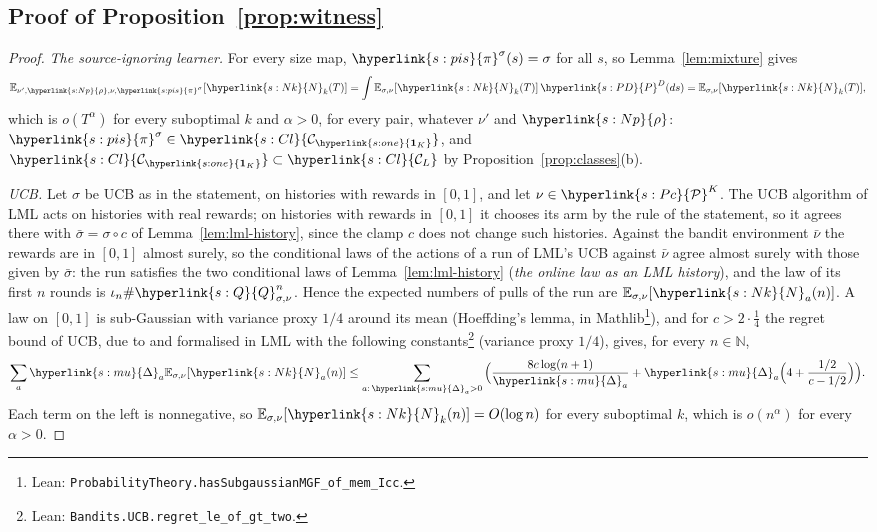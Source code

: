 \documentclass[11pt]{article}
\makeatletter
\newcommand{\sy}[2]{\hyperlink{#1}{#2}}
\newcommand{\E}{\mathbb{E}}
\newcommand{\N}{\mathbb{N}}
\newcommand{\Pc}{\sy{s:Pc}{\mathcal{P}}}
\newcommand{\ClL}[1][L]{\sy{s:Cl}{\mathcal{C}_{#1}}}
\newcommand{\one}{\sy{s:one}{\mathbf{1}_{K}}}
\newcommand{\rhos}{\sy{s:Np}{\rho}}
\newcommand{\PD}{\sy{s:PD}{P}^{D}}
\newcommand{\Q}{\sy{s:Q}{Q}}
\newcommand{\Nc}{\sy{s:Nk}{N}}
\newcommand{\gap}{\sy{s:mu}{\Delta}}
\newcommand{\pis}{\sy{s:pis}{\pi}^{\sigma}}
\newcommand{\leanfn}[1]{\ifincognita@blueprint\footnote{Lean: \nolinkurl{#1}.}\fi}
\makeatother
\begin{document}
\subsection{Proof of Proposition~\ref{prop:witness}}

\begin{proof}
\emph{The source-ignoring learner.} For every size map, $\pis(s)=\sigma$ for all $s$, so
Lemma~\ref{lem:mixture} gives
\begin{equation*}
\E_{\nu',\rhos,\nu,\pis}[\Nc_k(T)]=\int\E_{\sigma,\nu}[\Nc_k(T)]\,\PD(ds)=\E_{\sigma,\nu}[\Nc_k(T)],
\end{equation*}
which is $o(T^\alpha)$ for every suboptimal $k$ and $\alpha>0$, for every pair, whatever $\nu'$ and
$\rhos$: $\pis\in\ClL[\one]$, and $\ClL[\one]\subset\ClL$ by Proposition~\ref{prop:classes}(b).

\emph{UCB.} Let $\sigma$ be UCB as in the statement, on histories with rewards in $[0,1]$, and let
$\nu\in\Pc^K$. The UCB algorithm of LML acts on histories with real rewards; on histories with
rewards in $[0,1]$ it chooses its arm by the rule of the statement, so it agrees there with
$\bar\sigma=\sigma\circ c$ of Lemma~\ref{lem:lml-history}, since the clamp $c$ does not change such
histories. Against the bandit environment $\bar\nu$ the rewards are in $[0,1]$ almost surely, so
the conditional laws of the actions of a run of LML's UCB against $\bar\nu$ agree almost surely with
those given by $\bar\sigma$: the run satisfies the two conditional laws of
Lemma~\ref{lem:lml-history} (\emph{the online law as an LML history}), and the law of its first $n$
rounds is $\iota_n\#\Q^n_{\sigma,\nu}$. Hence the expected numbers of pulls of the run are
$\E_{\sigma,\nu}[\Nc_a(n)]$. A law on $[0,1]$ is sub-Gaussian with variance proxy $1/4$ around its
mean (Hoeffding's lemma, in Mathlib\leanfn{ProbabilityTheory.hasSubgaussianMGF_of_mem_Icc}), and
for $c>2\cdot\frac14$ the regret bound of UCB, due to \citet{ACF02} and formalised in LML with the
following constants\leanfn{Bandits.UCB.regret_le_of_gt_two} (variance proxy $1/4$), gives, for
every $n\in\N$,
\begin{equation*}
\sum_a\gap_a\E_{\sigma,\nu}[\Nc_a(n)]\le\sum_{a:\,\gap_a>0}\Big(\frac{8c\log(n+1)}{\gap_a}
+\gap_a\Big(4+\frac{1/2}{c-1/2}\Big)\Big).
\end{equation*}
Each term on the left is nonnegative, so $\E_{\sigma,\nu}[\Nc_k(n)]=O(\log n)$ for every suboptimal
$k$, which is $o(n^\alpha)$ for every $\alpha>0$.
\end{proof}
\end{document}
